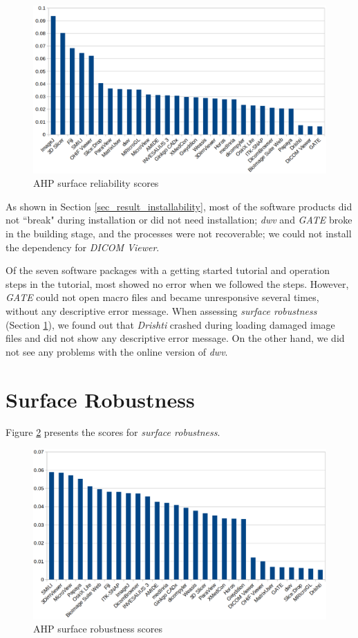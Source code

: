 \begin{figure}[H]
\includegraphics[scale=0.38]{figures/reliability_scores.png}
\caption{AHP surface reliability scores}
\label{fg_reliability_scores}
\end{figure}

As shown in Section \ref{sec_result_installability}, most of the software products did not ``break" during installation or did not need installation; \textit{dwv} and \textit{GATE} broke in the building stage, and the processes were not recoverable; we could not install the dependency for \textit{DICOM Viewer}.

Of the seven software packages with a getting started tutorial and operation steps in the tutorial, most showed no error when we followed the steps. However, \textit{GATE} could not open macro files and became unresponsive several times, without any descriptive error message. When assessing \textit{surface robustness} (Section \ref{sec_result_robustness}), we found out that \textit{Drishti} crashed during loading damaged image files and did not show any descriptive error message. On the other hand, we did not see any problems with the online version of \textit{dwv}.

\section{Surface Robustness}
\label{sec_result_robustness}
Figure \ref{fg_robustness_scores} presents the scores for \textit{surface robustness}.

\begin{figure}[H]
\includegraphics[scale=0.38]{figures/robustness_scores.png}
\caption{AHP surface robustness scores}
\label{fg_robustness_scores}
\end{figure}

